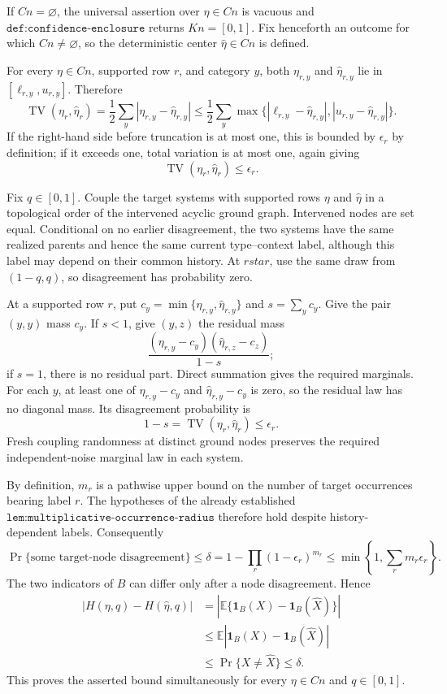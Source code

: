 If \(Cn=\varnothing\), the universal assertion over \(\eta\in Cn\) is vacuous and \(\texttt{def:confidence-enclosure}\) returns \(Kn=[0,1]\).  Fix henceforth an outcome for which \(Cn\neq\varnothing\), so the deterministic center \(\widehat\eta\in Cn\) is defined.

For every \(\eta\in Cn\), supported row \(r\), and category \(y\), both \(\eta_{r,y}\) and \(\widehat\eta_{r,y}\) lie in \([\ell_{r,y},u_{r,y}]\).  Therefore
\[
 \operatorname{TV}(\eta_r,\widehat\eta_r)
 =\frac12\sum_y|\eta_{r,y}-\widehat\eta_{r,y}|
 \leq \frac12\sum_y
 \max\{|\ell_{r,y}-\widehat\eta_{r,y}|,
          |u_{r,y}-\widehat\eta_{r,y}|\}.
\]
If the right-hand side before truncation is at most one, this is bounded by \(\epsilon_r\) by definition; if it exceeds one, total variation is at most one, again giving
\[
 \operatorname{TV}(\eta_r,\widehat\eta_r)\leq\epsilon_r.
\]

Fix \(q\in[0,1]\).  Couple the target systems with supported rows \(\eta\) and \(\widehat\eta\) in a topological order of the intervened acyclic ground graph.  Intervened nodes are set equal.  Conditional on no earlier disagreement, the two systems have the same realized parents and hence the same current type--context label, although this label may depend on their common history.  At \(rstar\), use the same draw from \((1-q,q)\), so disagreement has probability zero.

At a supported row \(r\), put \(c_y=\min\{\eta_{r,y},\widehat\eta_{r,y}\}\) and \(s=\sum_yc_y\).  Give the pair \((y,y)\) mass \(c_y\).  If \(s<1\), give \((y,z)\) the residual mass
\[
 \frac{(\eta_{r,y}-c_y)(\widehat\eta_{r,z}-c_z)}{1-s};
\]
if \(s=1\), there is no residual part.  Direct summation gives the required marginals.  For each \(y\), at least one of \(\eta_{r,y}-c_y\) and \(\widehat\eta_{r,y}-c_y\) is zero, so the residual law has no diagonal mass.  Its disagreement probability is
\[
 1-s=\operatorname{TV}(\eta_r,\widehat\eta_r)\leq\epsilon_r.
\]
Fresh coupling randomness at distinct ground nodes preserves the required independent-noise marginal law in each system.

By definition, \(m_r\) is a pathwise upper bound on the number of target occurrences bearing label \(r\).  The hypotheses of the already established \(\texttt{lem:multiplicative-occurrence-radius}\) therefore hold despite history-dependent labels.  Consequently
\[
 \Pr\{\text{some target-node disagreement}\}
 \leq\delta
 =1-\prod_r(1-\epsilon_r)^{m_r}
 \leq\min\left\{1,\sum_rm_r\epsilon_r\right\}.
\]
The two indicators of \(B\) can differ only after a node disagreement.  Hence
\[
 \begin{aligned}
 |H(\eta,q)-H(\widehat\eta,q)|
 &=\left|\mathbb E\{\mathbf1_B(X)-\mathbf1_B(\widehat X)\}\right|\\
 &\leq\mathbb E|\mathbf1_B(X)-\mathbf1_B(\widehat X)|\\
 &\leq\Pr\{X\neq\widehat X\}\leq\delta.
 \end{aligned}
\]
This proves the asserted bound simultaneously for every \(\eta\in Cn\) and \(q\in[0,1]\).

